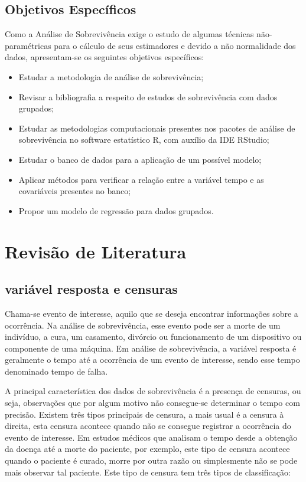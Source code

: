\subsection*{Objetivos Específicos}

Como a Análise de Sobrevivência exige o estudo de algumas técnicas não-paramétricas para o cálculo de seus estimadores e devido a não normalidade dos dados, apresentam-se os seguintes objetivos específicos:

\begin{itemize}
	
	\item Estudar a metodologia de análise de sobrevivência;
	\item Revisar a bibliografia a respeito de estudos de sobrevivência com dados grupados;	
	\item Estudar as metodologias computacionais presentes nos pacotes de análise de sobrevivência no software estatístico R, com auxílio da IDE RStudio;
	\item Estudar o banco de dados para a aplicação de um possível modelo;
	\item Aplicar métodos para verificar a relação entre a variável tempo e as covariáveis presentes no banco;
	\item Propor um modelo de regressão para dados grupados.
\end{itemize}

\vspace{1cm}

\section*{Revisão de Literatura}

\subsection*{variável resposta e censuras}
Chama-se evento de interesse, aquilo que se deseja encontrar informações sobre a ocorrência. Na análise de sobrevivência, esse evento pode ser a morte de um indivíduo, a cura, um casamento, divórcio ou funcionamento de um dispositivo ou componente de uma máquina. Em análise de sobrevivência, a variável resposta é geralmente o tempo até a ocorrência de um evento de interesse, sendo esse tempo denominado tempo de falha.%

A principal característica dos dados de sobrevivência é a presença de censuras, ou seja, observações que por algum motivo não consegue-se determinar o tempo com precisão. Existem três tipos principais de censura, a mais usual é a censura à direita, esta censura acontece quando não se consegue registrar a ocorrência do evento de interesse. Em estudos médicos que analisam o tempo desde a obtenção da doença até a morte do paciente, por exemplo, este tipo de censura acontece quando o paciente é curado, morre por outra razão ou simplesmente não se pode mais observar tal paciente. Este tipo de censura tem três tipos de classificação:

